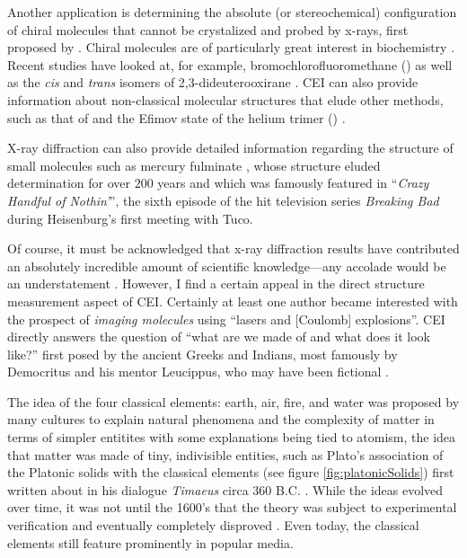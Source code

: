 Another application is determining the absolute (or stereochemical) configuration of chiral molecules that cannot be crystalized and probed by x-rays, first proposed by \citet{Kitamura01}. Chiral molecules are of particularly great interest in biochemistry \citep{Gardner05}. Recent studies have looked at, for example, bromochlorofluoromethane () \citep{Pitzer13} as well as the \emph{cis} and \emph{trans} isomers of 2,3-dideuterooxirane \citep{Herwig13}. CEI can also provide information about non-classical molecular structures that elude other methods, such as that of  \citep{Vager89} and the Efimov state of the helium trimer () \citep{Kunitski15}.

X-ray diffraction can also provide detailed information regarding the structure of small molecules such as mercury fulminate \citep{Beck07}, whose structure eluded determination for over $200$ years and which was famously featured in ``\textit{Crazy Handful of Nothin'}'', the sixth episode of the hit television series \textit{Breaking Bad} during Heisenburg's first meeting with Tuco.

Of course, it must be acknowledged that x-ray diffraction results have contributed an absolutely incredible amount of scientific knowledge---any accolade would be an understatement \citep{Hendrickson95}. However, I find a certain appeal in the direct structure measurement aspect of CEI. Certainly at least one author became interested with the prospect of \emph{imaging molecules} using ``lasers and [Coulomb] explosions''. CEI directly answers the question of ``what are we made of and what does it look like?'' first posed by the ancient Greeks and Indians, most famously by Democritus and his mentor Leucippus, who may have been fictional \citep{Taylor10}.

The idea of the four classical elements: earth, air, fire, and water was proposed by many cultures to explain natural phenomena and the complexity of matter in terms of simpler entitites with some explanations being tied to atomism, the idea that matter was made of tiny, indivisible entities, such as Plato's association of the Platonic solids with the classical elements (see figure \ref{fig:platonicSolids}) first written about in his dialogue \textit{Timaeus} circa 360 B.C. \citep{Cornford14}. While the ideas evolved over time, it was not until the 1600's that the theory was subject to experimental verification and eventually completely disproved \citep{Maxwell1873}. Even today, the classical elements still feature prominently in popular media.

